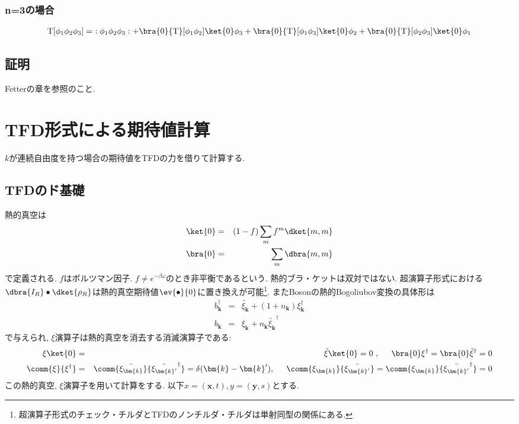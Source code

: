 \subsubsection{n=3の場合}
\begin{eqnarray}
  {\rm T}[\phi_1\phi_2\phi_3] =\ :\phi_1\phi_2\phi_3: + \bra{0}{\rm T}[\phi_1\phi_2]\ket{0}\phi_3 + \bra{0}{\rm T}[\phi_1\phi_3]\ket{0}\phi_2 + \bra{0}{\rm T}[\phi_2\phi_3]\ket{0}\phi_1 
\end{eqnarray}
\subsection{証明}
Fetterの章を参照のこと. 
\section{TFD形式による期待値計算}
$k$が連続自由度を持つ場合の期待値をTFDの力を借りて計算する.
\subsection{TFDのド基礎}
熱的真空は
\begin{eqnarray}
  \ket{0} &=& (1-f)\sum_mf^m\dket{m, m}\\
  \bra{0} &=& \sum_m\dbra{m, m}
\end{eqnarray}
で定義される. $f$はボルツマン因子. $f \neq e^{-\beta\omega}$のとき非平衡であるという. 熱的ブラ・ケットは双対ではない.
超演算子形式における$\dbra{I_R}\bullet\dket{\rho_R}$は熱的真空期待値$\ev{\bullet}{0}$に置き換えが可能\footnote{超演算子形式のチェック・チルダとTFDのノンチルダ・チルダは単射同型の関係にある. }. またBosonの熱的Bogoliubov変換の具体形は
\begin{eqnarray}
  b_{\bm{k}}^\dagger &=& \tilde{\xi_{\bm{k}}} + (1+n_{\bm{k}})\xi_{\bm{k}}^\dagger\\
  b_{\bm{k}} &=& \xi_{\bm{k}} + n_{\bm{k}}\tilde{\xi_{\bm{k}}}^\dagger
\end{eqnarray}
で与えられ, $\xi$演算子は熱的真空を消去する消滅演算子である:
\begin{eqnarray}
  \xi\ket{0} &=& \tilde{\xi}\ket{0} = 0\ ,\hspace{0.5cm} \bra{0}\xi^\dagger = \bra{0}\tilde{\xi}^\dagger = 0\\
  \comm{\xi}{\xi^\dagger} &=& \comm{\tilde{\xi_{\bm{k}}}}{\tilde{\xi_{\bm{k}'}}^\dagger} = \delta(\bm{k}-\bm{k}'), \hspace{0.5cm} \comm{\xi_{\bm{k}}}{\tilde{\xi_{\bm{k}'}}} = \comm{\xi_{\bm{k}}}{\tilde{\xi_{\bm{k}'}}^\dagger} = 0
\end{eqnarray}
この熱的真空, $\xi$演算子を用いて計算をする. 以下$x = (\bm{x}, t), y = (\bm{y}, s)$とする. 
